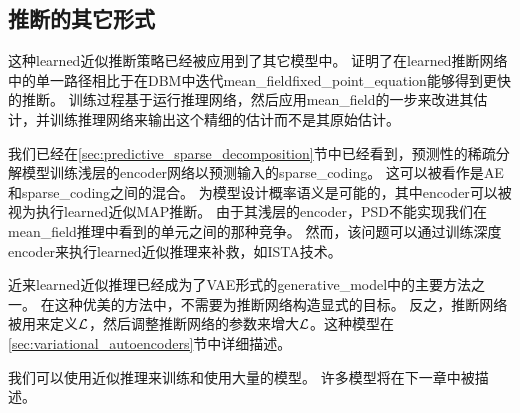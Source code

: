 \subsection{推断的其它形式}
\label{sec:other_forms_of_learned_inference}

这种\gls{learned}近似推断策略已经被应用到了其它模型中。
\citep{Salakhutdinov+Larochelle-2010}证明了在\gls{learned}推断网络中的单一路径相比于在\gls{DBM}中迭代\gls{mean_field}\gls{fixed_point_equation}能够得到更快的推断。
训练过程基于运行推理网络，然后应用\gls{mean_field}的一步来改进其估计，并训练推理网络来输出这个精细的估计而不是其原始估计。


我们已经在\ref{sec:predictive_sparse_decomposition}节中已经看到，预测性的稀疏分解模型训练浅层的\gls{encoder}网络以预测输入的\gls{sparse_coding}。
这可以被看作是\gls{AE}和\gls{sparse_coding}之间的混合。
为模型设计概率语义是可能的，其中\gls{encoder}可以被视为执行\gls{learned}近似\gls{MAP}推断。
由于其浅层的\gls{encoder}，PSD不能实现我们在\gls{mean_field}推理中看到的单元之间的那种竞争。
然而，该问题可以通过训练深度\gls{encoder}来执行\gls{learned}近似推理来补救，如ISTA技术\citep{Gregor+LeCun-ICML2010}。


近来\gls{learned}近似推理已经成为了\gls{VAE}形式的\gls{generative_model}中的主要方法之一\citep{Kingma+Welling-ICLR2014,Rezende-et-al-ICML2014}。
在这种优美的方法中，不需要为推断网络构造显式的目标。
反之，推断网络被用来定义$\mathcal{L}$，然后调整推断网络的参数来增大$\mathcal{L}$。这种模型在\ref{sec:variational_autoencoders}节中详细描述。

我们可以使用近似推理来训练和使用大量的模型。
许多模型将在下一章中被描述。
















